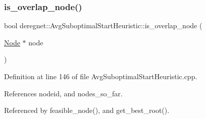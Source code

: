 \mbox{\label{classderegnet_1_1AvgSuboptimalStartHeuristic_abc4fa54576da31f3037f2c1aa2cd9140}} 
\subsubsection{\texorpdfstring{is\+\_\+overlap\+\_\+node()}{is\_overlap\_node()}}
{\footnotesize\ttfamily bool deregnet\+::\+Avg\+Suboptimal\+Start\+Heuristic\+::is\+\_\+overlap\+\_\+node (\begin{DoxyParamCaption}\item[{\hyperlink{namespacederegnet_a744bad34f2de9856d36715a445f027f3}{Node} $\ast$}]{node }\end{DoxyParamCaption})\hspace{0.3cm}{\ttfamily [private]}}



Definition at line 146 of file Avg\+Suboptimal\+Start\+Heuristic.\+cpp.



References nodeid, and nodes\+\_\+so\+\_\+far.



Referenced by feasible\+\_\+node(), and get\+\_\+best\+\_\+root().


